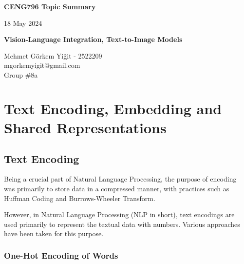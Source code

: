 \documentclass{article}
\begin{document}
\begin{titlepage}
    \begin{center}
        \vspace*{1cm}
            
        \Huge
        \textbf{CENG796 Topic Summary}
            
        \vspace{0.5cm}
        \Huge
        18 May 2024
            
        \vspace{1.5cm}
            
        \textbf{Vision-Language Integration, Text-to-Image Models}
            
        \vfill
            
        Mehmet Görkem Yiğit - 2522209\\
        mgorkemyigit@gmail.com\\
        Group \#8a\\
            
        \vspace{0.8cm}
            
    \end{center}
\end{titlepage}

\justify

\renewcommand*\contentsname{Table of Contents}
\tableofcontents
\newpage


\section{Text Encoding, Embedding and Shared Representations}

\subsection{Text Encoding}
Being a crucial part of Natural Language Processing, the purpose of encoding was primarily to store data in a compressed manner, with practices such as Huffman Coding and Burrows-Wheeler Transform.

However, in Natural Language Processing (NLP in short), text encodings are used primarily to represent the textual data with numbers. Various approaches have been taken for this purpose.

\subsubsection{One-Hot Encoding of Words}
\end{document}
